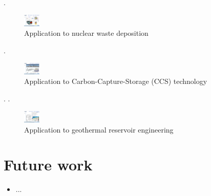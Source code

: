 \newpage
.
\vspace{6.5cm}
\begin{figure}[htb!]
\includegraphics[width=0.07\textwidth]{figures/THMC-Lecture_1.png}
\caption{Application to nuclear waste deposition}
\label{fig:apl1}
\end{figure}
.
\vspace{7.5cm}
\begin{figure}[htb!]
\includegraphics[width=0.07\textwidth]{figures/THMC-Lecture_2.png}
\caption{Application to Carbon-Capture-Storage (CCS) technology}
\label{fig:apl2}
\end{figure}
.
\newpage
.
\vspace{6.5cm}
\begin{figure}[htb!]
\includegraphics[width=0.07\textwidth]{figures/THMC-Lecture_3.png}
\caption{Application to geothermal reservoir engineering}
\label{fig:apl3}
\end{figure}

\section{Future work}

\begin{itemize}
  \item ...
\end{itemize}

